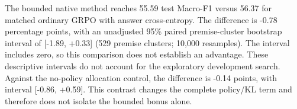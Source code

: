 The bounded native method reaches 55.59 test Macro-F1 versus 56.37 for matched ordinary GRPO with answer cross-entropy. The difference is -0.78 percentage points, with an unadjusted 95\% paired premise-cluster bootstrap interval of [-1.89, +0.33] (529 premise clusters; 10,000 resamples). The interval includes zero, so this comparison does not establish an advantage. These descriptive intervals do not account for the exploratory development search.
Against the no-policy allocation control, the difference is -0.14 points, with interval [-0.86, +0.59]. This contrast changes the complete policy/KL term and therefore does not isolate the bounded bonus alone.
